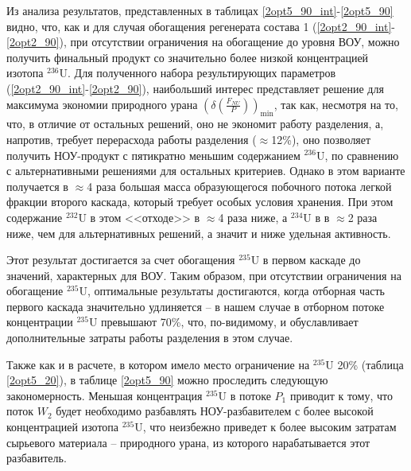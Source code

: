 Из анализа результатов, представленных в таблицах \ref{2opt5_90_int}-\ref{2opt5_90} видно, что, как и для случая обогащения регенерата состава 1 (\ref{2opt2_90_int}-\ref{2opt2_90}), при отсутствии ограничения на обогащение до уровня ВОУ, можно получить финальный продукт со значительно более низкой концентрацией изотопа $^{236}$U. Для полученного набора результирующих параметров (\ref{2opt2_90_int}-\ref{2opt2_90}), наибольший интерес представляет решение для максимума экономии природного урана $(\delta(\frac{F_{NU}}{P}))_\text{min}$, так как, несмотря на то, что, в отличие от остальных решений, оно не экономит работу разделения, а, напротив, требует перерасхода работы разделения ($\approx$12\%), оно позволяет получить НОУ-продукт с пятикратно меньшим содержанием $^{236}$U, по сравнению с альтернативными решениями для остальных критериев. Однако в этом варианте получается в $\approx$4 раза большая масса образующегося побочного потока легкой фракции второго каскада, который требует особых условия хранения. При этом содержание $^{232}$U в этом <<отходе>> в $\approx$4 раза ниже, а $^{234}$U в в $\approx$2 раза ниже, чем для альтернативных решений, а значит и ниже удельная активность.

Этот результат достигается за счет обогащения $^{235}$U в первом каскаде до значений, характерных для ВОУ. Таким образом, при отсутствии ограничения на обогащение $^{235}$U, оптимальные результаты достигаются, когда отборная часть первого каскада значительно удлиняется -- в нашем случае в отборном потоке концентрации $^{235}$U превышают 70\%, что, по-видимому, и обуславливает дополнительные затраты работы разделения в этом случае.

Также как и в расчете, в котором имело место ограничение на $^{235}$U 20\% (таблица \ref{2opt5_20}), в таблице \ref{2opt5_90} можно проследить следующую закономерность. Меньшая концентрация $^{235}$U в потоке $P_{1}$ приводит к тому, что поток $W_{2}$ будет необходимо разбавлять НОУ-разбавителем с более высокой концентрацией изотопа $^{235}$U, что неизбежно приведет к более высоким затратам сырьевого материала -- природного урана, из которого нарабатывается этот разбавитель.



